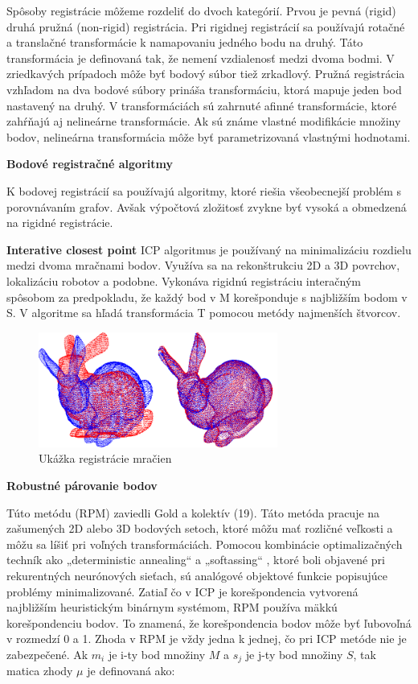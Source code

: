 Spôsoby registrácie môžeme rozdeliť do dvoch kategórií. Prvou je pevná (rigid) druhá pružná (non-rigid) registrácia. Pri rigidnej registrácií sa používajú rotačné a translačné transformácie k namapovaniu jedného bodu na druhý. Táto transformácia je definovaná tak, že nemení vzdialenosť medzi dvoma bodmi. V zriedkavých prípadoch môže byť bodový súbor tiež zrkadlový. Pružná registrácia vzhľadom na dva bodové súbory prináša transformáciu, ktorá mapuje jeden bod nastavený na druhý. V transformáciách sú zahrnuté afinné transformácie, ktoré zahŕňajú aj nelineárne transformácie. Ak sú známe vlastné modifikácie množiny bodov, nelineárna transformácia môže byť parametrizovaná vlastnými hodnotami.\newline

\textbf{Bodové registračné algoritmy}

K bodovej registrácií sa používajú algoritmy, ktoré riešia všeobecnejší problém s porovnávaním grafov. Avšak výpočtová zložitosť zvykne byť vysoká a obmedzená na rigidné registrácie.\newline


\textbf{Interative closest point}
ICP algoritmus je používaný na minimalizáciu rozdielu medzi dvoma mračnami bodov. Využíva sa na rekonštrukciu 2D a 3D povrchov, lokalizáciu robotov a podobne. Vykonáva rigidnú registráciu interačným spôsobom za predpokladu, že každý bod v M korešponduje s najbližším bodom v S. V algoritme sa hľadá transformácia T pomocou metódy najmenších štvorcov.

\begin{figure}[h]

	\centering

	\includegraphics[width=0.7\textwidth]{figures/icp_principle.png} 

	\caption{Ukážka registrácie mračien}
	\label{fig:icp_principle}

\end{figure}
\newpage
\textbf{Robustné párovanie bodov}

Túto metódu (RPM) zaviedli Gold a kolektív (19). Táto metóda pracuje na zašumených 2D alebo 3D bodových setoch, ktoré môžu mať rozličné veľkosti a môžu sa líšiť pri voľných transformáciách. Pomocou kombinácie optimalizačných techník ako „deterministic annealing“ a „softassing“ , ktoré boli objavené pri rekurentných neurónových sieťach, sú analógové objektové funkcie popisujúce problémy minimalizované. Zatiaľ čo v ICP je korešpondencia vytvorená najbližším heuristickým binárnym systémom, RPM používa mäkkú korešpondenciu bodov. To znamená, že korešpondencia bodov môže byť ľubovoľná v rozmedzí 0 a 1. Zhoda v RPM je vždy jedna k jednej, čo pri ICP metóde nie je zabezpečené. Ak $m_i$ je i-ty bod množiny $M$ a $s_j$ je j-ty bod množiny $S$, tak matica zhody $\mu$ je definovaná ako:

